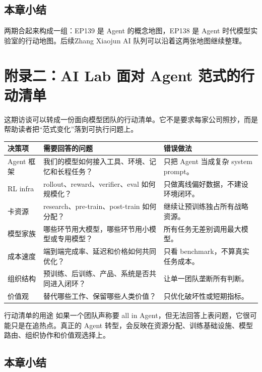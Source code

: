 \documentclass[a4paper]{article}
\begin{document}
\subsection{本章小结}

两期合起来构成一组：EP139 是 Agent 的概念地图，EP138 是 Agent 时代模型实验室的行动地图。后续Zhang Xiaojun AI 队列可以沿着这两张地图继续整理。


\section{附录二：AI Lab 面对 Agent 范式的行动清单}

这期访谈可以转成一份面向模型团队的行动清单。它不是要求每家公司照抄，而是帮助读者把“范式变化”落到可执行问题上。

\noindent\begin{longtable}{p{}p{}p{}}
\toprule
决策项 & 需要回答的问题 & 错误做法 \\
\midrule
Agent 框架 & 我们的模型如何接入工具、环境、记忆和长程任务？ & 只把 Agent 当成复杂 system prompt。 \\
RL infra & rollout、reward、verifier、eval 如何规模化？ & 只做离线偏好数据，不建设环境闭环。 \\
卡资源 & research、pre-train、post-train 如何分配？ & 继续让预训练独占所有战略资源。 \\
模型家族 & 哪些环节用大模型，哪些环节用小模型或专用模型？ & 所有任务无差别调用最大模型。 \\
成本速度 & 端到端完成率、延迟和价格如何共同优化？ & 只看 benchmark，不算真实任务成本。 \\
组织结构 & 预训练、后训练、产品、系统是否共同进入闭环？ & 让单一团队垄断所有判断。 \\
价值观 & 替代哪些工作、保留哪些人类价值？ & 只优化破坏性或短期指标。 \\
\bottomrule
\end{longtable}

\begin{importantbox}{行动清单的用途}
如果一个团队声称要 all in Agent，但无法回答上表问题，它很可能只是在追热点。真正的 Agent 转型，会反映在资源分配、训练基础设施、模型路由、组织协作和价值观选择上。
\end{importantbox}

\subsection{本章小结}
\end{document}
